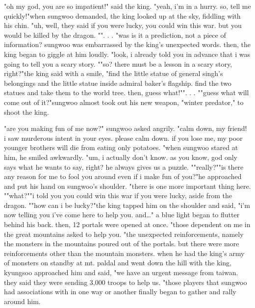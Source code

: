 "oh my god, you are so impatient!" said the king.
"yeah, i'm in a hurry.
 so, tell me quickly!"when sungwoo demanded, the king looked up at the sky, fiddling with his chin.
"uh, well, they said if you were lucky, you could win this war.
 but you would be killed by the dragon.
"".
.
.
"was is it a prediction, not a piece of information? sungwoo was embarrassed by the king's unexpected words.
 then, the king began to giggle at him loudly.
"look, i already told you in advance that i was going to tell you a scary story.
""so? there must be a lesson in a scary story, right?"the king said with a smile, "find the little statue of general singh's belongings and the little statue inside admiral baker's flagship.
 find the two statues and take them to the world tree.
 then, guess what!"".
.
.
""guess what will come out of it?"sungwoo almost took out his new weapon, "winter predator," to shoot the king.


"are you making fun of me now?" sungwoo asked angrily.
"calm down, my friend! i saw murderous intent in your eyes.
 please calm down.
 if you lose me, my poor younger brothers will die from eating only potatoes.
"when sungwoo stared at him, he smiled awkwardly.
"um, i actually don't know.
 as you know, god only says what he wants to say, right? he always gives us a puzzle.
""really?""is there any reason for me to fool you around even if i make fun of you?"he approached and put his hand on sungwoo's shoulder.
"there is one more important thing here.
""what?""i told you you could win this war if you were lucky, aside from the dragon.
""how can i be lucky?"the king tapped him on the shoulder and said, "i'm now telling you i've come here to help you.
 and…" a blue light began to flutter behind his back.
 then, 12 portals were opened at once.
"those dependent on me in the great mountains asked to help you.
"the unexpected reinforcements, namely the monsters in the mountains poured out of the portals.
 but there were more reinforcements other than the mountain monsters.
when he had the king's army of monsters on standby at mt.
 paldal and went down the hill with the king, kyungsoo approached him and said, "we have an urgent message from taiwan.
 they said they were sending 3,000 troops to help us.
"those players that sungwoo had associations with in one way or another finally began to gather and rally around him.


 